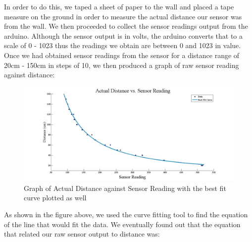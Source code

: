 \documentclass{article}
\begin{document}
In order to do this, we taped a sheet of paper to the wall and placed a tape measure on the ground in order to measure the actual distance our sensor was from the wall. We then proceeded to collect the sensor readings output from the arduino. Although the sensor output is in volts, the arduino converts that to a scale of 0 - 1023 thus the readings we obtain are between 0 and 1023 in value. \\

Once we had obtained sensor readings from the sensor for a distance range of 20cm - 150cm in steps of 10, we then produced a graph of raw sensor reading against distance:


\begin{figure}[h!]
\begin{center}
\includegraphics[scale=0.3]{ReadingDistance.jpg}
\caption{Graph of Actual Distance against Sensor Reading with the best fit curve plotted as well}
\end{center}
\end{figure}

As shown in the figure above, we used the curve fitting tool to find the equation of the line that would fit the data. We eventually found out that the equation that related our raw sensor output to distance was:
\end{document}
